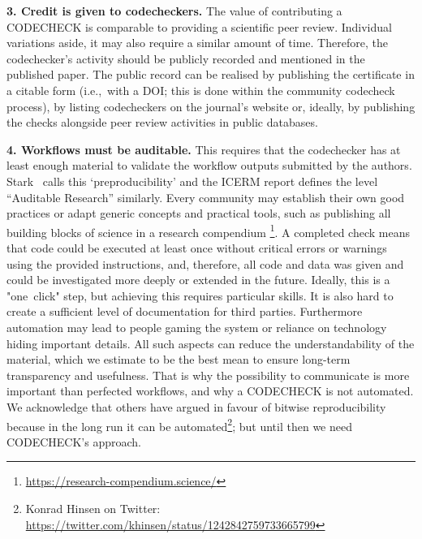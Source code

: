 \documentclass[12pt]{article}
\begin{document}
\textbf{3. Credit is given to codecheckers.} The value of contributing a
CODECHECK is comparable to providing a scientific peer review. Individual
variations aside, it may also require a similar amount of time. Therefore,
the codechecker's activity should be publicly recorded and mentioned in the
published paper.
The public record can be realised by publishing the certificate in a 
citable form (i.e.,~with a DOI; this is done within the community codecheck
process), by listing codecheckers on the journal's website or, ideally, by
publishing the checks alongside peer review activities in public databases.

\textbf{4. Workflows must be auditable.}
This requires that the codechecker 
has at least enough material to validate the workflow outputs submitted by 
the authors. Stark~\cite{stark_before_2018} calls this `preproducibility'
and the ICERM report \cite{stodden_setting_2013} defines the level
``Auditable Research''  similarly.
Every community may establish their own good practices or adapt generic
concepts and practical tools, such as publishing all building blocks
of science in a research compendium
\footnote{\url{https://research-compendium.science/}}.
A completed check means that code could be executed at least once without
critical errors or
warnings using the provided instructions, and, therefore, all code and data 
was given and could be investigated more deeply or extended in the future.
Ideally, this is a "one~click" step, but achieving this requires particular 
skills. It is also hard to create a sufficient level of documentation for 
third parties. Furthermore automation may lead to people gaming the system
or reliance on technology hiding important details. All such aspects can
reduce the understandability of the material, which we estimate to be the
best mean to ensure long-term transparency and usefulness.
That is why the possibility to communicate is more important
than perfected workflows, and why a CODECHECK is not automated.
We acknowledge that others have argued in favour of bitwise reproducibility
because in the long run it can be automated\footnote{Konrad Hinsen on 
Twitter: \url{https://twitter.com/khinsen/status/1242842759733665799}};
but until then we need CODECHECK's approach.
\end{document}

